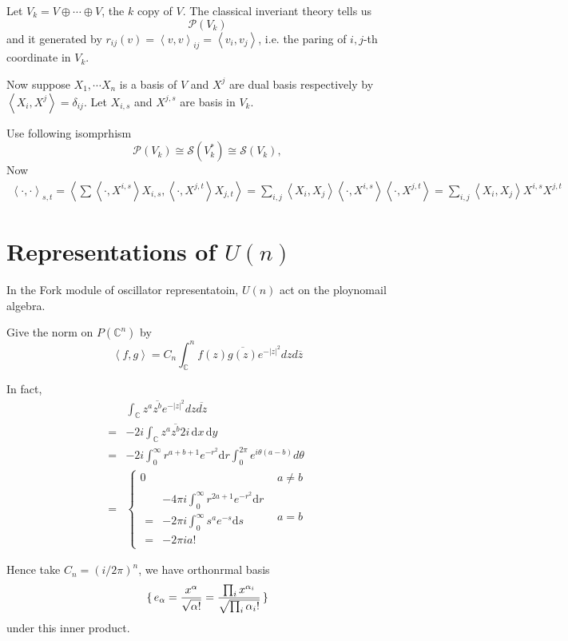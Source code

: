 \documentclass[12pt]{article}
\def\bC{{\mathbb{C}}}
\def\inn#1#2{\left\langle{#1},{#2}\right\rangle}
\def\abs#1{\left|{#1}\right|}
\def\css{\mathcal{S}}
\def\cpp{\mathcal{P}}
\begin{document}
Let $V_k = V\oplus \cdots \oplus V$, the $k$ copy of $V$. 
The classical inveriant theory tells us 
\[
\cpp(V_k) 
\]
and it generated by $r_{ij}(v) = \inn{v}{v}_{ij}= \inn{v_i}{v_j}$,
i.e. the paring of $i,j$-th 
coordinate in $V_k$.

Now suppose $X_1, \cdots X_n$ is a basis of $V$ and 
$X^j$ are dual basis respectively by $\inn{X_i}{X^j} = \delta_{ij}$.
Let $X_{i,s}$ and $X^{j,s}$ are basis in $V_k$. 

Use following isomprhism
\[
\cpp(V_k) \cong \css(V_k^*) \cong \css(V_k),
\]
Now
\[
\begin{split}
\inn{\cdot}{\cdot}_{s,t} = \inn{\sum \inn{\cdot}{X^{i,s}}X_{i,s}}{\inn{\cdot}{X^{j,t}}X_{j,t}} = \sum_{i,j} \inn{X_{i}}{X_{j}}\inn{\cdot}{X^{i,s}}\inn{\cdot}{X^{j,t}}
=\sum_{i,j} \inn{X_i}{X_j} X^{i,s}X^{j,t}
\end{split}
\]

\section{Representations of $U(n)$}
In the Fork module of oscillator representatoin,  
$U(n)$ act on the ploynomail algebra. 


Give the norm on $P(\bC^n)$ by
\[
\inn{f}{g} = C_n\int_\bC^nf(z)\overline{g(z)}e^{-\abs{z}^2}dzd\overline{z}
\]

\def\dd{\mathrm{d}}

In fact, 
\[
\begin{split}
 &\int_\bC z^a \overline{z^b} e^{-\abs{z}^2}dz\overline{dz} \\
=& -2i \int_\bC z^a \overline{z^b} 2i\,\dd x\,\dd y\\
=& -2i\int_{0}^\infty r^{a+b+1}e^{-r^2}\dd r \int_0^{2\pi} e^{i\theta(a-b)}d\theta\\
=& \begin{cases}
0 & a\neq b\\
\begin{split}
 &-4\pi i\int_0^\infty r^{2a+1} e^{-r^2} \dd r \\
=& -2\pi i \int_0^\infty s^a e^{-s}\dd s \\
=& -2\pi i a! 
\end{split}
& a=b 
\end{cases}
\end{split}
\]

Hence take $C_n = (i/2\pi)^n$, we have orthonrmal basis 
\[
\set{e_\alpha = \frac{x^\alpha}{\sqrt{\alpha!}}=\frac{\prod_i x^{\alpha_i}}{\sqrt{\prod_i \alpha_i!}}}
\]
under this inner product.
\end{document}
